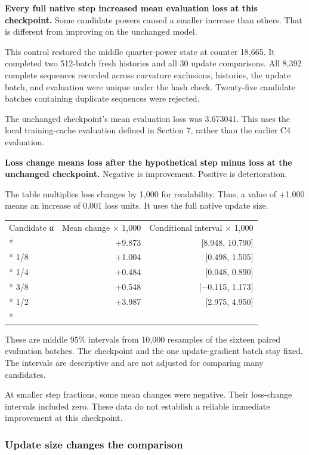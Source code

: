 \documentclass[
  14pt,
  letterpaper,
]{extarticle}
\newcounter{none} %
\begin{document}
\textbf{Every full native step increased mean evaluation loss at this
checkpoint.} Some candidate powers caused a smaller increase than
others. That is different from improving on the unchanged model.

This control restored the middle quarter-power state at counter 18,665.
It completed two 512-batch fresh histories and all 30 update
comparisons. All 8,392 complete sequences recorded across curvature
exclusions, histories, the update batch, and evaluation were unique
under the hash check. Twenty-five candidate batches containing duplicate
sequences were rejected.

The unchanged checkpoint's mean evaluation loss was 3.673041. This uses
the local training-cache evaluation defined in Section 7, rather than
the earlier C4 evaluation.

\textbf{Loss change means loss after the hypothetical step minus loss at
the unchanged checkpoint.} Negative is improvement. Positive is
deterioration.

The table multiplies loss changes by 1,000 for readability. Thus, a
value of +1.000 means an increase of 0.001 loss units. It uses the full
native update size.

{\def\LTcaptype{none} %
\begin{longtable}[]{@{}lrr@{}}
\toprule\noalign{}
Candidate α & Mean change × 1,000 & Conditional interval × 1,000 \\*
\midrule\noalign{}
\endhead
\bottomrule\noalign{}
\endlastfoot
0 & +9.873 & {[}8.948, 10.790{]} \\*
1/8 & +1.004 & {[}0.498, 1.505{]} \\*
1/4 & +0.484 & {[}0.048, 0.890{]} \\*
3/8 & +0.548 & {[}−0.115, 1.173{]} \\*
1/2 & +3.987 & {[}2.975, 4.950{]} \\*
\end{longtable}
}

These are middle 95\% intervals from 10,000 resamples of the sixteen
paired evaluation batches. The checkpoint and the one update-gradient
batch stay fixed. The intervals are descriptive and are not adjusted for
comparing many candidates.

At smaller step fractions, some mean changes were negative. Their
loss-change intervals included zero. These data do not establish a
reliable immediate improvement at this checkpoint.

\subsubsection{Update size changes the
comparison}\label{update-size-changes-the-comparison}
\end{document}
